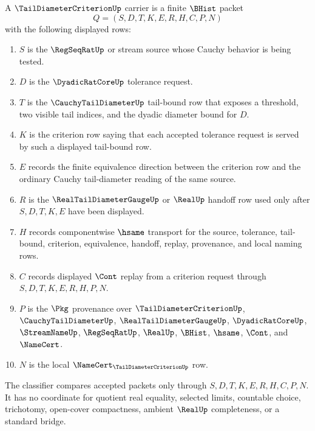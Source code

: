 \begin{definition}
\label{def:tail-diameter-criterion-carrier}
A $\TailDiameterCriterionUp$ carrier is a finite $\BHist$ packet
$$
Q=(S,D,T,K,E,R,H,C,P,N)
$$
with the following displayed rows:
\begin{enumerate}
\item $S$ is the $\RegSeqRatUp$ or stream source whose Cauchy behavior is being tested.
\item $D$ is the $\DyadicRatCoreUp$ tolerance request.
\item $T$ is the $\CauchyTailDiameterUp$ tail-bound row that exposes a threshold, two visible tail indices, and the dyadic diameter bound for $D$.
\item $K$ is the criterion row saying that each accepted tolerance request is served by such a displayed tail-bound row.
\item $E$ records the finite equivalence direction between the criterion row and the ordinary Cauchy tail-diameter reading of the same source.
\item $R$ is the $\RealTailDiameterGaugeUp$ or $\RealUp$ handoff row used only after $S,D,T,K,E$ have been displayed.
\item $H$ records componentwise $\hsame$ transport for the source, tolerance, tail-bound, criterion, equivalence, handoff, replay, provenance, and local naming rows.
\item $C$ records displayed $\Cont$ replay from a criterion request through $S,D,T,K,E,R,H,P,N$.
\item $P$ is the $\Pkg$ provenance over $\TailDiameterCriterionUp$, $\CauchyTailDiameterUp$, $\RealTailDiameterGaugeUp$, $\DyadicRatCoreUp$, $\StreamNameUp$, $\RegSeqRatUp$, $\RealUp$, $\BHist$, $\hsame$, $\Cont$, and $\NameCert$.
\item $N$ is the local $\NameCert_{\TailDiameterCriterionUp}$ row.
\end{enumerate}
The classifier compares accepted packets only through $S,D,T,K,E,R,H,C,P,N$. It has no coordinate for quotient real equality, selected limits, countable choice, trichotomy, open-cover compactness, ambient $\RealUp$ completeness, or a standard bridge.
\end{definition}

